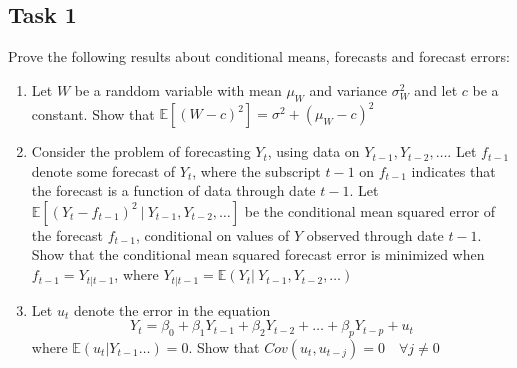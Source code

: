\documentclass[10pt,a4paper]{amsart}
\newcommand{\E}{\mathbb{E}}
\begin{document}


\subsection*{Task 1}
Prove the following results about conditional means, forecasts and forecast errors:
\begin{enumerate}
    \item Let $ W $ be a randdom variable with mean $ \mu_W $ and variance $ \sigma_W^{2} $ and let
          $ c $ be a constant. Show that $ \E \left[ (W - c)^{2} \right] = \sigma^{2} + (\mu_W - c)^{2}$
    \item  Consider the problem of forecasting $ Y_t $, using data on $ Y_{t-1}, Y_{t-2}, \dots $.
          Let $ f_{t-1} $ denote some forecast of $ Y_t $, where the subscript $ t-1 $ on $ f_{t-1} $
          indicates that the forecast is a function of data through date $ t − 1 $. Let
          $ \E [(Y_{t} − f_{t−1})^{2} ~|~ Y_{t-1}, Y_{t-2}, \dots] $  be the conditional mean squared
          error of the forecast $ f_{t-1} $, conditional on values of $ Y $ observed through date $ t − 1 $.
          Show that the conditional mean squared forecast error is minimized when $  f_{t−1} = Y_{t|t−1}$,
          where $  Y_{t|t−1} = \E (Y_t | ~ Y_{t-1}, Y_{t-2}, \dots )  $
    \item  Let $ u_t $ denote the error in the equation
          \[Y_t = \beta_0 +\beta_1Y_{t-1} + \beta_2 Y_{t-2} + \dots + \beta_p Y_{t-p} + u_t\]
          where $ \E (u_t | Y_{t-1} \dots)  = 0$. Show that $ Cov (u_t, u_{t-j}) = 0 \quad \forall j \ne 0 $
\end{enumerate}
\end{document}
